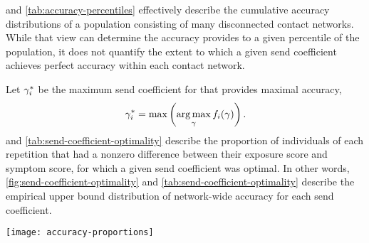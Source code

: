  and \cref{tab:accuracy-percentiles} effectively describe the cumulative accuracy distributions of a population consisting of many disconnected contact networks. While that view can determine the accuracy  provides to a given percentile of the population, it does not quantify the extent to which a given send coefficient achieves perfect accuracy within each contact network. 

Let $\gamma_i^*$ be the maximum send coefficient for  that provides maximal accuracy,
\begin{equation*}
  \gamma_i^* = \max \left(\underset{\gamma}{\operatorname{\arg\max}} \, f_i(\gamma)\right).
\end{equation*}
 and \cref{tab:send-coefficient-optimality} describe the proportion of individuals of each repetition that had a nonzero difference between their exposure score and symptom score, for which a given send coefficient was optimal. In other words, \cref{fig:send-coefficient-optimality} and \cref{tab:send-coefficient-optimality} describe the empirical upper bound distribution of network-wide accuracy for each send coefficient.

\begin{sidewaysfigure}[tbp]
  \centering
  \texttt{[image: accuracy-proportions]}
  \caption[Send coefficient optimality distributions]{Send coefficient optimality distributions. The dashed line inside each violin marks the median. The upper and lower dotted lines inside each violin mark the upper and lower quartiles, respectively.}
  \label{fig:send-coefficient-optimality}
\end{sidewaysfigure}

